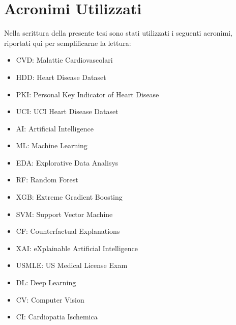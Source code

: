 \documentclass[12pt]{report}
\begin{document}
\listoffigures

\thispagestyle{empty}
\clearpage
\setcounter{page}{1}
\section*{Acronimi Utilizzati}
Nella scrittura della presente tesi sono stati utilizzati i seguenti acronimi, riportati qui per semplificarne la lettura:
\begin{itemize}
    \item CVD: Malattie Cardiovascolari
    \item HDD: Heart Disease Dataset
    \item PKI: Personal Key Indicator of Heart Disease
    \item UCI: UCI Heart Disease Dataset
    \item AI: Artificial Intelligence
    \item ML: Machine Learning
    \item EDA: Explorative Data Analisys
    \item RF: Random Forest
    \item XGB: Extreme Gradient Boosting
    \item SVM: Support Vector Machine
    \item CF: Counterfactual Explanations
    \item XAI: eXplainable Artificial Intelligence
    \item USMLE: US Medical License Exam
    \item DL: Deep Learning
    \item CV: Computer Vision
    \item CI: Cardiopatia Ischemica
\end{itemize}%


\clearpage



\clearpage



\clearpage

\clearpage



\clearpage

\clearpage



\clearpage





\appendix



%
\end{document}
